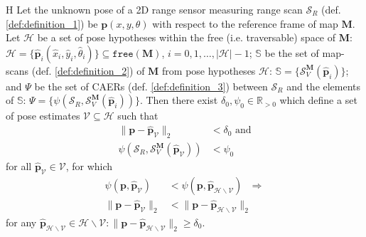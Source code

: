 
\begin{customhpt}{H}
  \label{hpt:hypothesis_h}
  Let the unknown pose of a 2D range sensor measuring range scan $\mathcal{S}_R$
  (def. \ref{def:definition_1}) be $\bm{p}(x,y,\theta)$ with respect to the
  reference frame of map $\bm{M}$.  Let $\mathcal{H}$ be a set of pose
  hypotheses within the free (i.e. traversable) space of $\bm{M}$:
  $\mathcal{H} = \{\hat{\bm{p}}_i(\hat{x}_i,\hat{y}_i,\hat{\theta}_i)\} \subseteq \texttt{free}(\bm{M})$, $i=0,1,\dots,|\mathcal{H}|-1$; $\mathbb{S}$
  be the set of map-scans (def. \ref{def:definition_2}) of $\bm{M}$ from pose
  hypotheses $\mathcal{H}$:
  $\mathbb{S} = \{\mathcal{S}_V^{\bm{M}}(\hat{\bm{p}}_i)\}$; and $\Psi$ be the
  set of CAERs (def. \ref{def:definition_3}) between $\mathcal{S}_R$ and the
  elements of $\mathbb{S}$:
  $\Psi = \{\psi(\mathcal{S}_R, \mathcal{S}_V^{\bm{M}}(\hat{\bm{p}}_i))\}$.
  Then there exist $\delta_0,\psi_0 \in \mathbb{R}_{> 0}$ which define a set of
  pose estimates $\mathcal{V} \subseteq \mathcal{H}$ such that
  \begin{align}
    \|\bm{p}-\hat{\bm{p}}_\mathcal{V}\|_2 &< \delta_0 \nonumber \text{ and}\\
    \psi(\mathcal{S}_R,\mathcal{S}_V^{\bm{M}}(\hat{\bm{p}}_\mathcal{V})) &< \psi_0 \nonumber
  \end{align}
  for all $\hat{\bm{p}}_\mathcal{V} \in \mathcal{V}$, for which
  \begin{align}
    \psi(\bm{p}, \hat{\bm{p}}_\mathcal{V}) &< \psi(\bm{p}, \hat{\bm{p}}_{\mathcal{H} \backslash \mathcal{V}}) \ \ \ \Rightarrow \nonumber \\
    \|\bm{p}-\hat{\bm{p}}_\mathcal{V}\|_2 &< \|\bm{p}-\hat{\bm{p}}_{\mathcal{H} \backslash \mathcal{V}}\|_2 \nonumber
  \end{align}
  for any $\hat{\bm{p}}_{\mathcal{H} \backslash \mathcal{V}} \in {\mathcal{H} \backslash \mathcal{V}}: \|\bm{p}-\hat{\bm{p}}_{\mathcal{H} \backslash \mathcal{V}}\|_2 \geq \delta_0$.
\end{customhpt}





\begin{figure}[]\centering
  
  \caption{\small }
  \label{fig:cbgl}
\end{figure}


\begin{figure}[]\centering
  
  \caption{\small }
  \label{fig:cbgl}
\end{figure}
